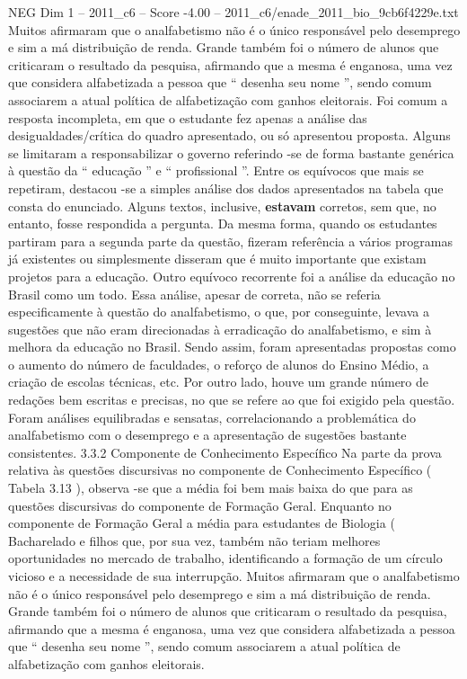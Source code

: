\begin{textsample}{NEG Dim 1 – 2011\_c6 – Score -4.00 – 2011\_c6/enade\_2011\_bio\_9cb6f4229e.txt}
Muitos afirmaram que o analfabetismo não é o único responsável pelo desemprego e sim a má distribuição de renda.
Grande também foi o número de alunos que criticaram o resultado da pesquisa, afirmando que a mesma é enganosa, uma vez que considera alfabetizada a pessoa que “ desenha seu nome ”, sendo comum associarem a atual política de alfabetização com ganhos eleitorais.
Foi comum a resposta incompleta, em que o estudante fez apenas a análise das desigualdades/crítica do quadro apresentado, ou só apresentou proposta.
Alguns se limitaram a responsabilizar o governo referindo -se de forma bastante genérica à questão da “ educação ” e “ profissional ”.
Entre os equívocos que mais se repetiram, destacou -se a simples análise dos dados apresentados na tabela que consta do enunciado.
Alguns textos, inclusive, \textbf{estavam} corretos, sem que, no entanto, fosse respondida a pergunta.
Da mesma forma, quando os estudantes partiram para a segunda parte da questão, fizeram referência a vários programas já existentes ou simplesmente disseram que é muito importante que existam projetos para a educação.
Outro equívoco recorrente foi a análise da educação no Brasil como um todo.
Essa análise, apesar de correta, não se referia especificamente à questão do analfabetismo, o que, por conseguinte, levava a sugestões que não eram direcionadas à erradicação do analfabetismo, e sim à melhora da educação no Brasil.
Sendo assim, foram apresentadas propostas como o aumento do número de faculdades, o reforço de alunos do Ensino Médio, a criação de escolas técnicas, etc.
Por outro lado, houve um grande número de redações bem escritas e precisas, no que se refere ao que foi exigido pela questão.
Foram análises equilibradas e sensatas, correlacionando a problemática do analfabetismo com o desemprego e a apresentação de sugestões bastante consistentes. 3.3.2 Componente de Conhecimento Específico Na parte da prova relativa às questões discursivas no componente de Conhecimento Específico ( Tabela 3.13 ), observa -se que a média foi bem mais baixa do que para as questões discursivas do componente de Formação Geral.
Enquanto no componente de Formação Geral a média para estudantes de Biologia ( Bacharelado e filhos que, por sua vez, também não teriam melhores oportunidades no mercado de trabalho, identificando a formação de um círculo vicioso e a necessidade de sua interrupção.
Muitos afirmaram que o analfabetismo não é o único responsável pelo desemprego e sim a má distribuição de renda.
Grande também foi o número de alunos que criticaram o resultado da pesquisa, afirmando que a mesma é enganosa, uma vez que considera alfabetizada a pessoa que “ desenha seu nome ”, sendo comum associarem a atual política de alfabetização com ganhos eleitorais.

\end{textsample}
